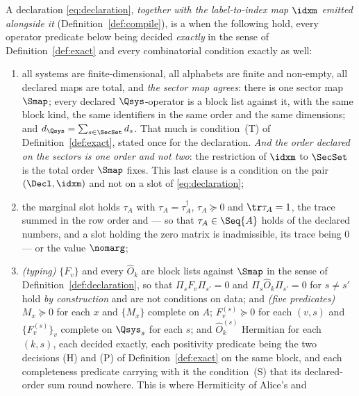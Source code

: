 \begin{definition}\label{def:target}
A declaration \eqref{eq:declaration}, \emph{together with the label-to-index
map $\idxm$ emitted alongside it} (Definition~\ref{def:compile}), is a
when the following hold, every operator predicate below being decided
\emph{exactly} in the sense of Definition~\ref{def:exact} and every
combinatorial condition exactly as well:
\begin{enumerate}[label=D(\roman*),leftmargin=3.2em]
\item all systems are finite-dimensional, all alphabets are finite and
  non-empty, all declared maps are total, and \emph{the sector map agrees}:
  there is one sector map $\Smap$; every declared $\Qsys$-operator is a
  block list against it, with the same block kind, the same
  identifiers in the same order and the same dimensions; and
  $d_{\Qsys}=\sum_{s\in\SecSet}d_s$. That much is condition~(T) of
  Definition~\ref{def:exact}, stated once for the declaration. \emph{And the
  order declared on the sectors is one order and not two}: the restriction of
  $\idxm$ to $\SecSet$ is the total order $\Smap$ fixes. This last clause is a
  condition on the pair $(\Decl,\idxm)$ and not on a slot of
  \eqref{eq:declaration};
\item the marginal slot holds $\tau_A$ with $\tau_A=\tau_A^{\dagger}$,
  $\tau_A\succeq0$ and $\tr\tau_A=1$, the trace summed in the row order and
   --- so that $\tau_A\in\Seq{A}$
  holds of the declared numbers, and a slot holding the zero matrix is
  inadmissible, its trace being $0$ --- or the value $\nomarg$;
\item \emph{(typing)} $\{F_v\}$ and every $\hat O_k$ are block lists against
  $\Smap$ in the sense of Definition~\ref{def:declaration}, so that
  $\Pi_sF_v\Pi_{s'}=0$ and $\Pi_s\hat O_k\Pi_{s'}=0$ for $s\ne s'$ hold
  \emph{by construction} and are not conditions on data; and
  \emph{(five predicates)} $M_x\succeq0$ for each $x$ and $\{M_x\}$ complete on
  $A$; $F_v^{(s)}\succeq0$ for each $(v,s)$ and $\{F_v^{(s)}\}_v$ complete on
  $\Qsys_s$ for each $s$; and $\hat O_k^{(s)}$ Hermitian for each $(k,s)$,
  each decided exactly, each positivity predicate being the two decisions
  (H) and (P) of Definition~\ref{def:exact} on the same block, and each
  completeness predicate carrying with it the condition~(S) that its
  declared-order sum round nowhere. This is where Hermiticity of Alice's and

\end{enumerate}
\end{definition}
